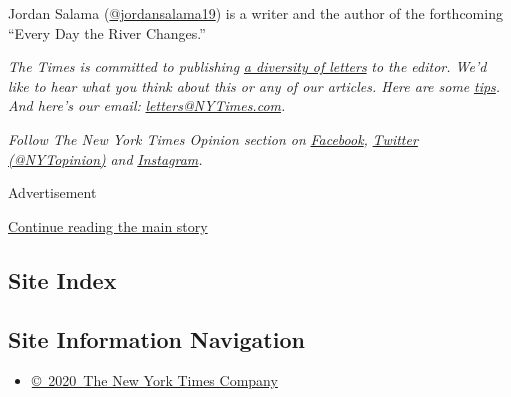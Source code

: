 Jordan Salama
(\href{https://twitter.com/JordanSalama19}{@jordansalama19}) is a writer
and the author of the forthcoming ``Every Day the River Changes.''

\emph{The Times is committed to publishing}
\href{https://www.nytimes3xbfgragh.onion/2019/01/31/opinion/letters/letters-to-editor-new-york-times-women.html}{\emph{a
diversity of letters}} \emph{to the editor. We'd like to hear what you
think about this or any of our articles. Here are some}
\href{https://help.nytimes3xbfgragh.onion/hc/en-us/articles/115014925288-How-to-submit-a-letter-to-the-editor}{\emph{tips}}\emph{.
And here's our email:}
\href{mailto:letters@NYTimes.com}{\emph{letters@NYTimes.com}}\emph{.}

\emph{Follow The New York Times Opinion section on}
\href{https://www.facebookcorewwwi.onion/nytopinion}{\emph{Facebook}}\emph{,}
\href{http://twitter.com/NYTOpinion}{\emph{Twitter (@NYTopinion)}}
\emph{and}
\href{https://www.instagram.com/nytopinion/}{\emph{Instagram}}\emph{.}

Advertisement

\protect\hyperlink{after-bottom}{Continue reading the main story}

\hypertarget{site-index}{%
\subsection{Site Index}\label{site-index}}

\hypertarget{site-information-navigation}{%
\subsection{Site Information
Navigation}\label{site-information-navigation}}

\begin{itemize}
\tightlist
\item
  \href{https://help.nytimes3xbfgragh.onion/hc/en-us/articles/115014792127-Copyright-notice}{©~2020~The
  New York Times Company}
\end{itemize}

